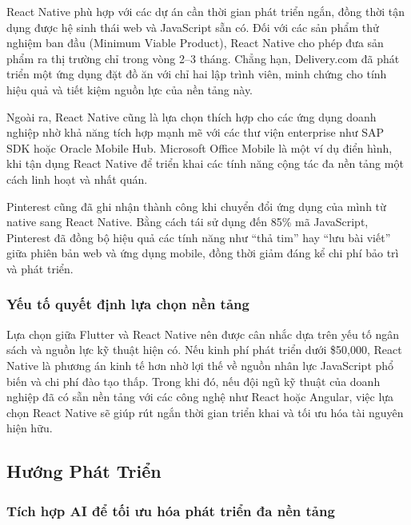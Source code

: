 \indent React Native phù hợp với các dự án cần thời gian phát triển ngắn, đồng thời tận dụng được hệ sinh thái web và JavaScript sẵn có. Đối với các sản phẩm thử nghiệm ban đầu (Minimum Viable Product), React Native cho phép đưa sản phẩm ra thị trường chỉ trong vòng 2–3 tháng. Chẳng hạn, Delivery.com đã phát triển một ứng dụng đặt đồ ăn với chỉ hai lập trình viên, minh chứng cho tính hiệu quả và tiết kiệm nguồn lực của nền tảng này.

\vspace{0.5em}

\indent Ngoài ra, React Native cũng là lựa chọn thích hợp cho các ứng dụng doanh nghiệp nhờ khả năng tích hợp mạnh mẽ với các thư viện enterprise như SAP SDK hoặc Oracle Mobile Hub. Microsoft Office Mobile là một ví dụ điển hình, khi tận dụng React Native để triển khai các tính năng cộng tác đa nền tảng một cách linh hoạt và nhất quán.

\vspace{0.5em}

\indent Pinterest cũng đã ghi nhận thành công khi chuyển đổi ứng dụng của mình từ native sang React Native. Bằng cách tái sử dụng đến 85\% mã JavaScript, Pinterest đã đồng bộ hiệu quả các tính năng như “thả tim” hay “lưu bài viết” giữa phiên bản web và ứng dụng mobile, đồng thời giảm đáng kể chi phí bảo trì và phát triển.

\subsubsection{Yếu tố quyết định lựa chọn nền tảng}

\indent Lựa chọn giữa Flutter và React Native nên được cân nhắc dựa trên yếu tố ngân sách và nguồn lực kỹ thuật hiện có. Nếu kinh phí phát triển dưới \$50,000, React Native là phương án kinh tế hơn nhờ lợi thế về nguồn nhân lực JavaScript phổ biến và chi phí đào tạo thấp. Trong khi đó, nếu đội ngũ kỹ thuật của doanh nghiệp đã có sẵn nền tảng với các công nghệ như React hoặc Angular, việc lựa chọn React Native sẽ giúp rút ngắn thời gian triển khai và tối ưu hóa tài nguyên hiện hữu.


\subsection{Hướng Phát Triển}

\subsubsection{Tích hợp AI để tối ưu hóa phát triển đa nền tảng}

